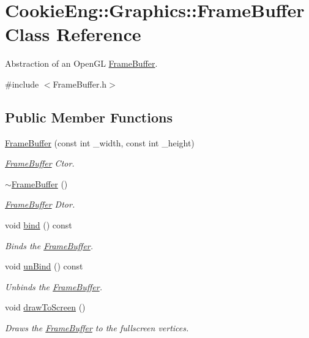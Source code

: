 \hypertarget{class_cookie_eng_1_1_graphics_1_1_frame_buffer}{}\section{Cookie\+Eng\+:\+:Graphics\+:\+:Frame\+Buffer Class Reference}
\label{class_cookie_eng_1_1_graphics_1_1_frame_buffer}


Abstraction of an Open\+GL \hyperlink{class_cookie_eng_1_1_graphics_1_1_frame_buffer}{Frame\+Buffer}.  




{\ttfamily \#include $<$Frame\+Buffer.\+h$>$}

\subsection*{Public Member Functions}
\begin{DoxyCompactItemize}
\item 
\hyperlink{class_cookie_eng_1_1_graphics_1_1_frame_buffer_aebfd6fefe83f74d3b776f83a22a69477}{Frame\+Buffer} (const int \+\_\+width, const int \+\_\+height)
\begin{DoxyCompactList}\small\item\em \hyperlink{class_cookie_eng_1_1_graphics_1_1_frame_buffer}{Frame\+Buffer} Ctor. \end{DoxyCompactList}\item 
\hyperlink{class_cookie_eng_1_1_graphics_1_1_frame_buffer_a51742a4a0c6beeaeb4c2f14c7c97c79a}{$\sim$\+Frame\+Buffer} ()
\begin{DoxyCompactList}\small\item\em \hyperlink{class_cookie_eng_1_1_graphics_1_1_frame_buffer}{Frame\+Buffer} Dtor. \end{DoxyCompactList}\item 
void \hyperlink{class_cookie_eng_1_1_graphics_1_1_frame_buffer_ab2fb31d8a065cc53e95233a388fd2d09}{bind} () const
\begin{DoxyCompactList}\small\item\em Binds the \hyperlink{class_cookie_eng_1_1_graphics_1_1_frame_buffer}{Frame\+Buffer}. \end{DoxyCompactList}\item 
void \hyperlink{class_cookie_eng_1_1_graphics_1_1_frame_buffer_a4c859cb199e5a770b1532a83d4b39af5}{un\+Bind} () const
\begin{DoxyCompactList}\small\item\em Unbinds the \hyperlink{class_cookie_eng_1_1_graphics_1_1_frame_buffer}{Frame\+Buffer}. \end{DoxyCompactList}\item 
void \hyperlink{class_cookie_eng_1_1_graphics_1_1_frame_buffer_ad206df318f47af664391600585249171}{draw\+To\+Screen} ()
\begin{DoxyCompactList}\small\item\em Draws the \hyperlink{class_cookie_eng_1_1_graphics_1_1_frame_buffer}{Frame\+Buffer} to the fullscreen vertices. \end{DoxyCompactList}\end{DoxyCompactItemize}
